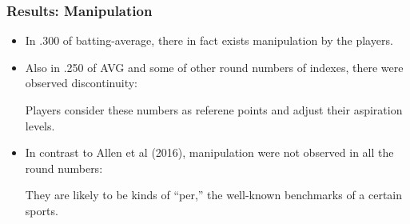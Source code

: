 \documentclass[dvipdfmx,12pt]{beamer}
\begin{document}
\begin{frame}\frametitle{Results: Manipulation}
  \begin{itemize}
    \item In .300 of batting-average, there in fact exists manipulation by the players.

    \item Also in .250 of AVG and some of other round numbers of indexes, there were observed discontinuity:

    Players consider these numbers as referene points and adjust their aspiration levels.

    \item In contrast to Allen et al (2016), manipulation were not observed in all the round numbers:

    They are likely to be kinds of ``per,'' the well-known benchmarks of a certain sports.

  \end{itemize}
\end{frame}
\end{document}
